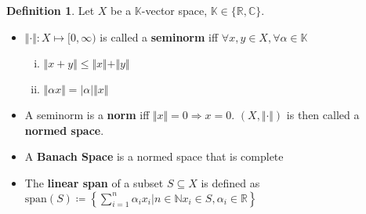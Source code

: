\documentclass[10pt,a4paper]{article}
\theoremstyle{definition}
\newtheorem{definition}{Definition}
\theoremstyle{cor}
\theoremstyle{theorem}
\theoremstyle{lemma}
\theoremstyle{example}
\theoremstyle{remark}
\newcommand{\norm}[1]{\Vert #1 \Vert}
\begin{document}
\begin{definition}
Let $X$ be a $\mathbb{K}$-vector space, $\mathbb{K}\in\{\mathbb{R}, \mathbb{C}\}$.
\begin{itemize}
\item $\Vert\cdot\Vert : X \mapsto [0, \infty)$ is called a \textbf{seminorm} iff $\forall x, y \in X, \forall \alpha\in\mathbb{K}$
\begin{enumerate}[(i)]
\item $\Vert x + y \Vert \leq \Vert x \Vert + \Vert y \Vert$
\item $\Vert\alpha x \Vert = |\alpha| \Vert x \Vert$
\end{enumerate}
\item A seminorm is a \textbf{norm} iff $\norm{x} = 0 \Rightarrow x = 0$. $(X, \norm{\cdot})$ is then called a \textbf{normed space}.
\item A \textbf{Banach Space} is a normed space that is complete
\item The \textbf{linear span} of a subset $S \subseteq X$ is defined as $\text{span}(S) \coloneqq \left\{ \sum_{i = 1}^{n} \alpha_i x_i | n\in \mathbb{N} x_i \in S, \alpha_i \in \mathbb{R}\right\}$
\end{itemize}
\end{definition}
\end{document}
